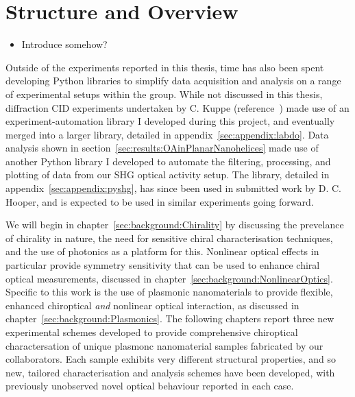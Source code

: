 \chapter{Structure and Overview}\label{sec:background:Introduction}
\color{red}

\begin{itemize}
    \item Introduce somehow?
\end{itemize}
\color{black}

Outside of the experiments reported in this thesis, time has also been spent developing Python libraries to simplify data acquisition and analysis on a range of experimental setups within the group. While not discussed in this thesis, diffraction CID experiments undertaken by C. Kuppe (reference~\cite{Kuppe2018}) made use of an experiment-automation library I developed during this project, and eventually merged into a larger library, detailed in appendix~\ref{sec:appendix:labdo}. Data analysis shown in section~\ref{sec:results:OAinPlanarNanohelices} made use of another Python library I developed to automate the filtering, processing, and plotting of data from our SHG optical activity setup. The library, detailed in appendix~\ref{sec:appendix:pyshg}, has since been used in submitted work by D. C. Hooper, and is expected to be used in similar experiments going forward.

We will begin in chapter~\ref{sec:background:Chirality} by discussing the prevelance of chirality in nature, the need for sensitive chiral characterisation techniques, and the use of photonics as a platform for this. Nonlinear optical effects in particular provide symmetry sensitivity that can be used to enhance chiral optical measurements, discussed in chapter~\ref{sec:background:NonlinearOptics}. Specific to this work is the use of plasmonic nanomaterials to provide flexible, enhanced chiroptical \textit{and} nonlinear optical interaction, as discussed in chapter~\ref{sec:background:Plasmonics}. The following chapters report three new experimental schemes developed to provide comprehensive chiroptical charactersation of unique plasmonc nanomaterial samples fabricated by our collaborators. Each sample exhibits very different structural properties, and so new, tailored characterisation and analysis schemes have been developed, with previously unobserved novel optical behaviour reported in each case.